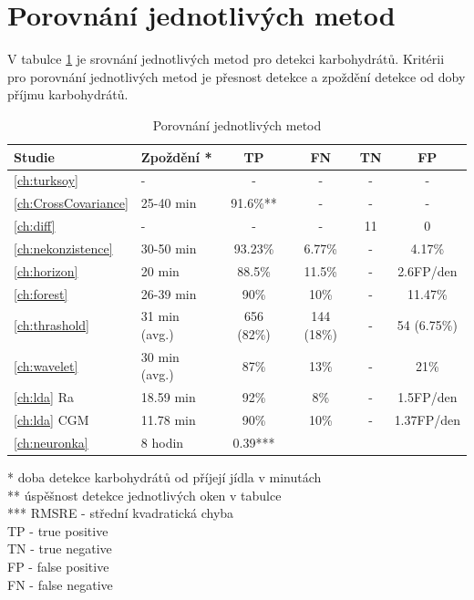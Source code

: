 \section{Porovnání jednotlivých metod}

V tabulce \ref{tab:res} je srovnání jednotlivých metod pro detekci karbohydrátů. Kritérii pro porovnání jednotlivých metod je přesnost detekce a zpoždění detekce od doby příjmu karbohydrátů.

\begin{table}[H]
\caption{Porovnání jednotlivých metod}
\label{tab:res}
\centering
\begin{tabular}{|l|l|c|c|c|c|}
\hline 
\textbf{Studie} & \textbf{Zpoždění *} & \textbf{TP} & \textbf{FN} & \textbf{TN} & \textbf{FP}\tabularnewline
\hline 
\hline 
\ref{ch:turksoy} & - & - & - & - & -\tabularnewline
\hline 
\ref{ch:CrossCovariance} & 25-40 min & 91.6\%{**} & - & - & -\tabularnewline
\hline 
\ref{ch:diff} & - & - & - & 11 & 0\tabularnewline
\hline 
\ref{ch:nekonzistence} & 30-50 min & 93.23\% & 6.77\% & - & 4.17\%\tabularnewline
\hline
\ref{ch:horizon} & 20 min & 88.5\% & 11.5\% & - & 2.6FP/den\tabularnewline
\hline 
\ref{ch:forest} & 26-39 min & 90\% & 10\% & - & 11.47\%\tabularnewline
\hline 
\ref{ch:thrashold} & 31 min (avg.) & 656 (82\%) & 144 (18\%) & - & 54 (6.75\%)\tabularnewline
\hline 
\ref{ch:wavelet} & 30 min (avg.) & 87\% & 13\% & - & 21\%\tabularnewline
\hline 
\ref{ch:lda} Ra & 18.59 min & 92\% & 8\% & - & 1.5FP/den\tabularnewline
\hline 
\ref{ch:lda} CGM & 11.78 min & 90\% & 10\% & - & 1.37FP/den\tabularnewline
\hline
\ref{ch:neuronka} & 8 hodin & 0.39{***} & & & \tabularnewline
\hline
\end{tabular}
\begin{flushleft}
* doba detekce karbohydrátů od příjejí jídla v minutách\\
{**} úspěšnost detekce jednotlivých oken v tabulce\\
{***} RMSRE - střední kvadratická chyba\\
TP - true positive\\
TN - true negative\\
FP - false positive\\
FN - false negative\\
\end{flushleft}
\end{table}


